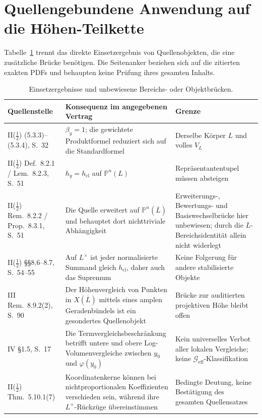 \documentclass[11pt,a4paper]{article}
\theoremstyle{definition}
\theoremstyle{remark}
\newcommand{\Geff}{\mathcal{G}_{\mathrm{eff}}}
\begin{document}
\section{Quellengebundene Anwendung auf die Höhen-Teilkette}\label{sec:sourcebound}

Tabelle~\ref{tab:substitution_audit} trennt das direkte Einsetzergebnis von
Quellenobjekten, die eine zusätzliche Brücke benötigen.
Die Seitenanker beziehen sich auf die zitierten exakten PDFs und behaupten
keine Prüfung ihres gesamten Inhalts.

\begin{table}[htbp]
\centering\small
\caption{Einsetzergebnisse und unbewiesene Bereichs- oder Objektbrücken.}\label{tab:substitution_audit}
\begin{tabularx}{\textwidth}{@{}p{}XX@{}}
\toprule
Quellenstelle & Konsequenz im angegebenen Vertrag & Grenze\\
\midrule
II($\tfrac12$) (5.3.3)--(5.3.4), S.~32 & $\beta_y=1$; die gewichtete Produktformel reduziert sich auf die Standardformel & Derselbe Körper $L$ und volles $V_L$\\
\addlinespace
II($\tfrac12$) Def.~8.2.1 / Lem.~8.2.3, S.~51 & $h_y=h_{\mathrm{cl}}$ auf $\mathbb P^n(L)$ & Repräsentantentupel müssen absteigen\\
\addlinespace
II($\tfrac12$) Rem.~8.2.2 / Prop.~8.3.1, S.~51 & Die Quelle erweitert auf $\mathbb P^n(\overline L)$ und behauptet dort nichttriviale Abhängigkeit & Erweiterungs-, Bewertungs- und Basiswechselbrücke hier unbewiesen; durch die $L$-Bereichsidentität allein nicht widerlegt\\
\addlinespace
II($\tfrac12$) \S\S8.6--8.7, S.~54--55 & Auf $L^\times$ ist jeder normalisierte Summand gleich $h_{\mathrm{cl}}$, daher auch das Supremum & Keine Folgerung für andere stabilisierte Objekte\\
\addlinespace
III Rem.~8.9.2(2), S.~90 & Der Höhenvergleich von Punkten in $X(\overline L)$ mittels eines amplen Geradenbündels ist ein gesondertes Quellenobjekt & Brücke zur auditierten projektiven Höhe bleibt offen\\
\addlinespace
IV \S1.5, S.~17 & Die Termvergleichsbeschränkung betrifft untere und obere Log-Volumenvergleiche zwischen $y_0$ und $\varphi(y_0)$ & Kein universelles Verbot aller lokalen Vergleiche; keine $\Geff$-Klassifikation\\
\addlinespace
II($\tfrac12$) Thm.~5.10.1(7) & Koordinatenkerne können bei nichtproportionalen Koeffizienten verschieden sein, während ihre $L^\times$-Rückzüge übereinstimmen & Bedingte Deutung, keine Bestätigung des gesamten Quellensatzes\\
\bottomrule
\end{tabularx}
\end{table}
\end{document}
